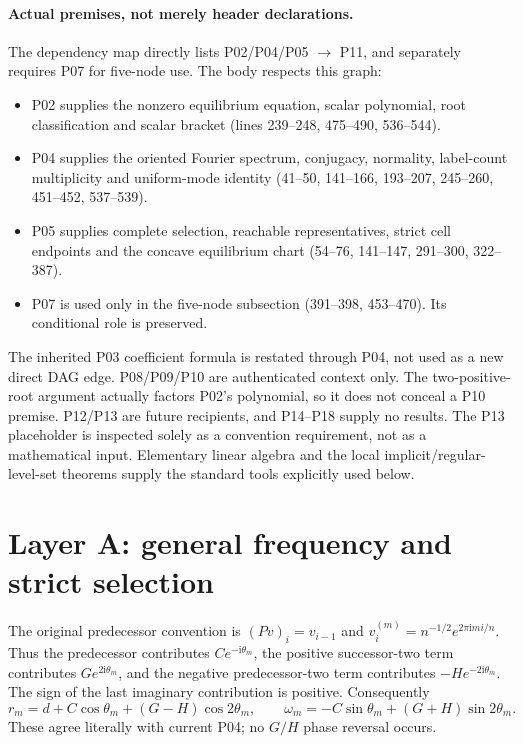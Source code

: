 \documentclass[11pt]{article}
\newcommand{\ii}{\mathrm i}
\begin{document}
\paragraph{Actual premises, not merely header declarations.}
The dependency map directly lists P02/P04/P05 $\to$ P11, and separately
requires P07 for five-node use. The body respects this graph:
\begin{itemize}[nosep]
\item P02 supplies the nonzero equilibrium equation, scalar polynomial,
root classification and scalar bracket (lines 239--248, 475--490,
536--544).
\item P04 supplies the oriented Fourier spectrum, conjugacy, normality,
label-count multiplicity and uniform-mode identity (41--50, 141--166,
193--207, 245--260, 451--452, 537--539).
\item P05 supplies complete selection, reachable representatives, strict
cell endpoints and the concave equilibrium chart (54--76, 141--147,
291--300, 322--387).
\item P07 is used only in the five-node subsection (391--398, 453--470).
Its conditional role is preserved.
\end{itemize}
The inherited P03 coefficient formula is restated through P04, not used
as a new direct DAG edge. P08/P09/P10 are authenticated context only.
The two-positive-root argument actually factors P02's polynomial, so it
does not conceal a P10 premise. P12/P13 are future recipients, and
P14--P18 supply no results. The P13 placeholder is inspected solely as a
convention requirement, not as a mathematical input. Elementary linear
algebra and the local implicit/regular-level-set theorems supply the
standard tools explicitly used below.

\section{Layer A: general frequency and strict selection}
\label{sec:A}
The original predecessor convention is $(Pv)_i=v_{i-1}$ and
$v_i^{(m)}=n^{-1/2}e^{2\pi\ii mi/n}$. Thus the predecessor contributes
$Ce^{-\ii\theta_m}$, the positive successor-two term contributes
$Ge^{2\ii\theta_m}$, and the negative predecessor-two term contributes
$-He^{-2\ii\theta_m}$. The sign of the last imaginary contribution is
positive. Consequently
\[
 r_m=d+C\cos\theta_m+(G-H)\cos2\theta_m,\qquad
 \omega_m=-C\sin\theta_m+(G+H)\sin2\theta_m.
\]
These agree literally with current P04; no $G/H$ phase reversal occurs.
\end{document}
